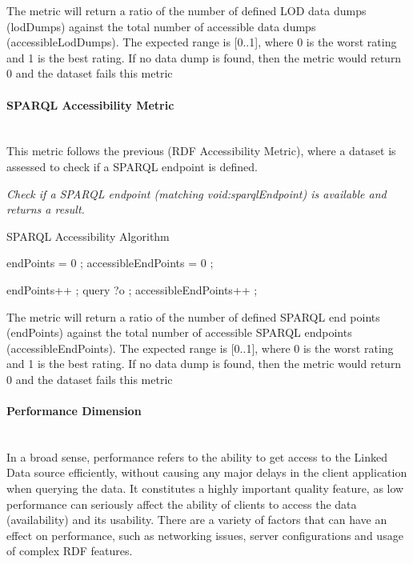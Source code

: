 The metric will return a ratio of the number of defined LOD data dumps (lodDumps) against the total number of accessible data dumps (accessibleLodDumps). 
The expected range is [0..1], where 0 is the worst rating and 1 is the best rating. If no data dump is found, then the metric would return 0 and the dataset fails this metric

\paragraph{SPARQL Accessibility Metric}~\\
This metric follows the previous (RDF Accessibility Metric), where a dataset is assessed to check if a SPARQL endpoint is defined.

\begin{mdframed}[style=metricdefinition]
\emph{Check if a SPARQL endpoint (matching void:sparqlEndpoint) is available and returns a result.}
\end{mdframed}

\begin{algorithm}
\caption{SPARQL Accessibility Algorithm}\label{lst:deref}
\begin{algorithmic}[1]
\State endPoints = 0 ;
\State accessibleEndPoints = 0 ;
\EndProcedure

\State endPoints++ ; 
\State query ?o ;
 accessibleEndPoints++ ; \EndIf
\EndIf
\EndProcedure
\end{algorithmic}
\end{algorithm}

The metric will return a ratio of the number of defined SPARQL end points (endPoints) against the total number of accessible SPARQL endpoints (accessibleEndPoints). 
The expected range is [0..1], where 0 is the worst rating and 1 is the best rating. If no data dump is found, then the metric would return 0 and the dataset fails this metric

\paragraph{Performance Dimension}~\\ %
In a broad sense, performance refers to the ability to get access to the Linked Data source efficiently, without causing any major delays in the client application when querying the data. It constitutes a highly important quality feature, as low performance can seriously affect the ability of clients to access the data (availability) and its usability. There are a variety of factors that can have an effect on performance, such as networking issues, server configurations and usage of complex RDF features.


